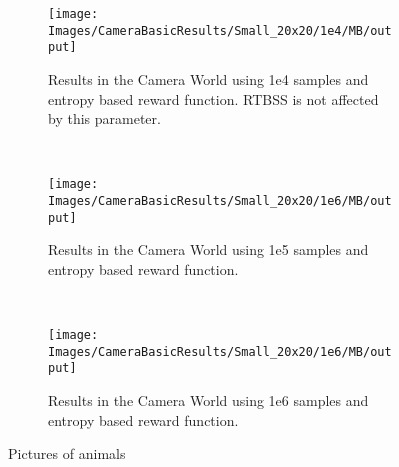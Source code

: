 \begin{figure}[h]
        \centering
        \begin{subfigure}[t]{0.3\textwidth}
                \texttt{[image: Images/CameraBasicResults/Small\_20x20/1e4/MB/output]}
                \caption{Results in the Camera World using 1e4 samples and entropy based reward
                function. RTBSS is not affected by this parameter.}
                \label{fig:m4e}
        \end{subfigure}%
        ~ %
        \begin{subfigure}[t]{0.3\textwidth}
                \texttt{[image: Images/CameraBasicResults/Small\_20x20/1e6/MB/output]}
                \caption{Results in the Camera World using 1e5 samples and entropy based reward
                function.}
                \label{fig:m5e}
        \end{subfigure}
        ~ %
        \begin{subfigure}[t]{0.3\textwidth}
                \texttt{[image: Images/CameraBasicResults/Small\_20x20/1e6/MB/output]}
                \caption{Results in the Camera World using 1e6 samples and entropy based reward
                function.}
                \label{fig:m6e}
        \end{subfigure}
        \caption{Pictures of animals}\label{fig:me}
\end{figure}


